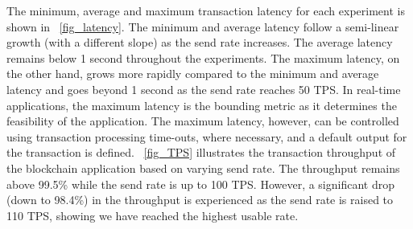 The minimum, average and maximum transaction latency for each experiment is shown in \figureautorefname~\ref{fig_latency}. The minimum and average latency follow a semi-linear growth (with a different slope) as the send rate increases. The average latency remains below 1 second throughout the experiments. The maximum latency, on the other hand, grows more rapidly compared to the minimum and average latency and goes beyond 1 second as the send rate reaches 50 \ac{TPS}. In real-time applications, the maximum latency is the bounding metric as it determines the feasibility of the application. The maximum latency, however, can be controlled using transaction processing time-outs, where necessary, and a default output for the transaction is defined. \figureautorefname~\ref{fig_TPS} illustrates the transaction throughput of the blockchain application based on varying send rate. The throughput remains above 99.5\% while the send rate is up to 100 \ac{TPS}. However, a significant drop (down to 98.4\%) in the throughput is experienced as the send rate is raised to 110 \ac{TPS}, showing we have reached the highest usable rate.


